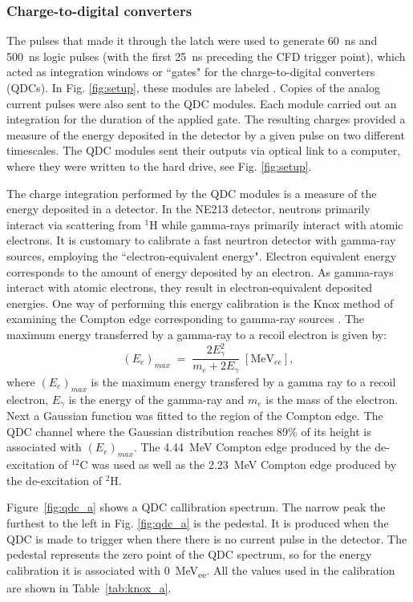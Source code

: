 \documentclass[main.tex]{subfiles}
\begin{document}
\subsubsection{Charge-to-digital converters}\label{sec:Ecal_A}
The pulses that made it through the latch were used to generate \SI{60}{\ns} and \SI{500}{\ns} logic pulses (with the first \SI{25}{\ns} preceding the CFD trigger point), which acted as integration windows or ``gates" for the charge-to-digital converters (QDCs). In Fig. \ref{fig:setup}, these modules are labeled . Copies of the analog current pulses were also sent to the QDC modules. Each module carried out an integration for the duration of the applied gate. The resulting charges provided a measure of the energy deposited in the detector by a given pulse on two different timescales. The QDC modules sent their outputs via optical link to a computer, where they were written to the hard drive, see Fig. \ref{fig:setup}.

The charge integration performed by the QDC modules is a measure of the energy deposited in a detector. In the NE213 detector, neutrons primarily interact via scattering from $^1$H while gamma-rays primarily interact with atomic electrons. It is customary to calibrate a fast neurtron detector with gamma-ray sources, employing the ``electron-equivalent energy". Electron equivalent energy corresponds to the amount of energy deposited by an electron. As gamma-rays interact with atomic electrons, they result in electron-equivalent deposited energies. One way of performing this energy calibration is the Knox method of examining the Compton edge corresponding to gamma-ray sources \cite{Nilsson}. The maximum energy transferred by a gamma-ray to a recoil electron is given by:
\begin{equation}
	(E_{e})_{max}\;=\;\frac{2E_{\gamma}^2}{m_e + 2E_\gamma} \;[\textrm{MeV}_{ee}],
\end{equation}
where $(E_e)_{max}$ is the maximum energy transfered by a gamma ray to a recoil electron, $E_\gamma$ is the energy of the gamma-ray and $m_e$ is the mass of the electron.
Next a Gaussian function was fitted to the region of the Compton edge. The QDC channel where the Gaussian distribution reaches 89\% of its height is associated with $(E_e)_{max}$. The \SI{4.44}{MeV} Compton edge produced by the de-excitation of $^{12}$C was used as well as the \SI{2.23}{MeV} Compton edge produced by the de-excitation of $^2$H.

Figure~\ref{fig:qdc_a} shows a QDC callibration spectrum. The narrow peak the furthest to the left in Fig. \ref{fig:qdc_a} is the pedestal. It is produced when the QDC is made to trigger when there there is no current pulse in the detector. The pedestal represents the zero point of the QDC spectrum, so for the energy calibration it is associated with \SI{0}{MeV_{ee}}. All the values used in the calibration are shown in Table~\ref{tab:knox_a}.
\end{document}
